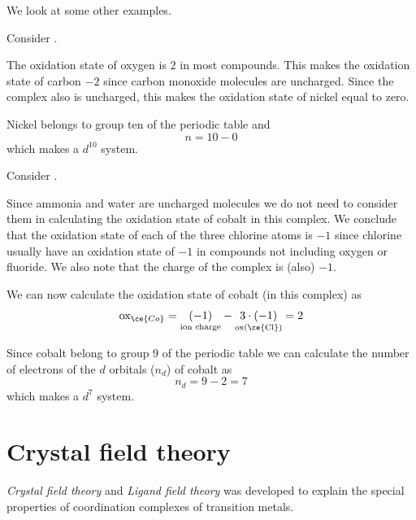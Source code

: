 \documentclass[../mit-general-chemistry.tex]{subfiles}
\begin{document}
We look at some other examples.

\begin{example}
  Consider \ce{[Ni(CO)4]}.

  The oxidation state of oxygen is $2$ in most compounds. This makes
  the oxidation state of carbon $-2$ since carbon monoxide molecules
  are uncharged. Since the complex also is uncharged, this makes the
  oxidation state of nickel equal to zero.

  Nickel belongs to group ten of the periodic table and
  \begin{equation*}
    n = 10 - 0
  \end{equation*}
  which makes \ce{[Ni(CO)4]} a $d^{10}$ system.
\end{example}

\begin{example}
  Consider \ce{[Co(H2O)2(NH3)Cl]^-}.

  Since ammonia and water are uncharged molecules we do not need to
  consider them in calculating the oxidation state of cobalt in this
  complex. We conclude that the oxidation state of each of the three
  chlorine atoms is $-1$ since chlorine usually have an oxidation
  state of $-1$ in compounds not including oxygen or fluoride. We also
  note that the charge of the complex is (also) $-1$.

  We can now calculate the oxidation state of cobalt (in this complex)
  as
  \begin{equation*}
    \text{ox}_{\ce{Co}}
    = \underset{\text{ion charge}}{(-1)}
    - \underset{\text{ox(\ce{Cl})}}{3\cdot(-1)} = 2
  \end{equation*}

  Since cobalt belong to group $9$ of the periodic table we can
  calculate the number of electrons of the $d$ orbitals ($n_d$) of
  cobalt as
  \begin{equation*}
    n_d = 9 - 2 = 7
  \end{equation*}
  which makes \ce{[Co(H2O)2(NH3)Cl]^-} a $d^7$ system.
\end{example}







\section{Crystal field theory}




{\em Crystal field theory} and {\em Ligand field theory} was developed
to explain the special properties of coordination complexes of
transition metals.
\end{document}
